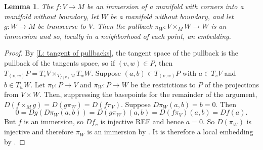 \documentclass[12pt]{article}
\theoremstyle{plain}
\newtheorem{lemma}[theorem]{Lemma}
\theoremstyle{definition}
\theoremstyle{remark}
\begin{document}
\begin{lemma}
	The $f \colon V \to M$ be an immersion of a manifold with corners into a manifold without boundary, let $W$ be a manifold without boundary, and let $g \colon W \to M$ be transverse to $V$. 
	Then the pullback $\pi_W: V \times_M W \to W$ is an immersion and so, locally in a neighborhood of each point, an embedding.
\end{lemma}
\begin{proof}
	By \cref{L: tangent of pullbacks}, the tangent space of the pullback is the pullback of the tangents space, so if $(v,w) \in P$, then $T_{(v,w)}P = T_vV \times_{T_{f(v)}M} T_wW$. 
	Suppose $(a,b) \in T_{(v,w)}P$ with $a \in T_vV$ and $b \in T_wW$. 
	Let $\pi_V \colon P \to V$ and $\pi_W \colon P \to W$ be the restrictions to $P$ of the projections from $V \times W$.
	Then, suppressing the basepoints for the remainder of the argument, $D(f \times_M g) = D(g\pi_W) = D(f \pi_V)$.
	Suppose $D\pi_W(a,b)= b = 0$. 
	Then $$0 = Dg(D\pi_W(a,b))= D(g\pi_W)(a,b) = D(f \pi_V)(a,b) = Df(a).$$
	But $f$ is an immersion, so $Df_v$ is injective REF and hence $a=0$. 
	So $D(\pi_W)$ is injective and therefore $\pi_W$ is an immersion by \cite[Proposition 3.2.6]{MaDo92}.
	It is therefore a local embedding by \cite[Proposition 3.2.13]{MaDo92}.  
\end{proof}
\end{document}
